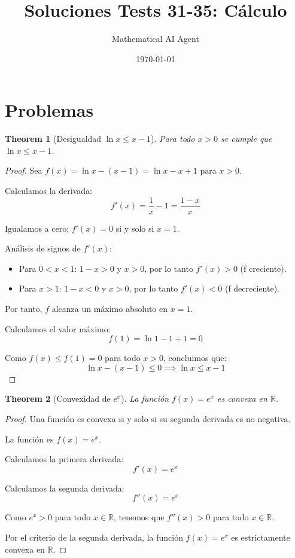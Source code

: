 \documentclass[11pt,a4paper]{article}
\title{Soluciones Tests 31-35: Cálculo}
\author{Mathematical AI Agent}
\date{\today}
\theoremstyle{plain}
\newtheorem{theorem}{Theorem}[section]
\theoremstyle{definition}
\begin{document}
\maketitle

\section{Problemas}

\begin{theorem}[Desigualdad $\ln x \leq x - 1$]
Para todo $x > 0$ se cumple que $\ln x \leq x - 1$.
\end{theorem}

\begin{proof}
Sea $f(x) = \ln x - (x - 1) = \ln x - x + 1$ para $x > 0$.

Calculamos la derivada:
\[
f'(x) = \frac{1}{x} - 1 = \frac{1 - x}{x}
\]

Igualamos a cero: $f'(x) = 0$ si y solo si $x = 1$.

Análisis de signos de $f'(x)$:
\begin{itemize}
    \item Para $0 < x < 1$: $1 - x > 0$ y $x > 0$, por lo tanto $f'(x) > 0$ (f creciente).
    \item Para $x > 1$: $1 - x < 0$ y $x > 0$, por lo tanto $f'(x) < 0$ (f decreciente).
\end{itemize}

Por tanto, $f$ alcanza un máximo absoluto en $x = 1$.

Calculamos el valor máximo:
\[
f(1) = \ln 1 - 1 + 1 = 0
\]

Como $f(x) \leq f(1) = 0$ para todo $x > 0$, concluimos que:
\[
\ln x - (x - 1) \leq 0 \implies \ln x \leq x - 1
\]
\end{proof}

\begin{theorem}[Convexidad de $e^x$]
La función $f(x) = e^x$ es convexa en $\mathbb{R}$.
\end{theorem}

\begin{proof}
Una función es convexa si y solo si su segunda derivada es no negativa.

La función es $f(x) = e^x$.

Calculamos la primera derivada:
\[
f'(x) = e^x
\]

Calculamos la segunda derivada:
\[
f''(x) = e^x
\]

Como $e^x > 0$ para todo $x \in \mathbb{R}$, tenemos que $f''(x) > 0$ para todo $x \in \mathbb{R}$.

Por el criterio de la segunda derivada, la función $f(x) = e^x$ es estrictamente convexa en $\mathbb{R}$.
\end{proof}
\end{document}
